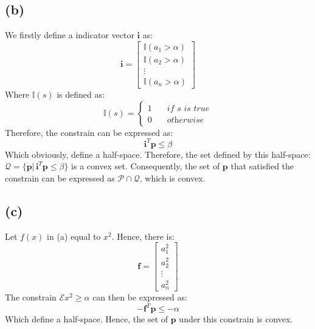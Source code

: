 \documentclass[10pt,a4paper]{article}
\begin{document}
\subsection*{(b)}
We firstly define a indicator vector $\mathbf{i}$ as:
\begin{equation*}
	\mathbf{i} = \begin{bmatrix}
	\mathbb{I}(a_{1} > \alpha) \\
	\mathbb{I}(a_{2} > \alpha) \\
	\vdots \\
	\mathbb{I}(a_{n} > \alpha)
	\end{bmatrix}
\end{equation*}
Where $\mathbb{I}(s)$ is defined as:
\begin{equation*}
	\mathbb{I}(s) = 
	\begin{cases}
		1 & \quad \textit{if } s \textit{ is true} \\
		0 & \quad \textit{otherwise}
	\end{cases}
\end{equation*} 
Therefore, the constrain can be expressed as:
\begin{equation*}
	\mathbf{i}^{T} \mathbf{p} \leq \beta
\end{equation*}
Which obviously, define a half-space. Therefore, the set defined by this half-space: $\mathcal{Q} = \{ \mathbf{p} |\,  \mathbf{i}^{T} \mathbf{p} \leq \beta \}$ is a convex set. Consequently, the set of $\mathbf{p}$ that satisfied the constrain can be expressed as $\mathcal{P} \cap \mathcal{Q}$, which is convex.

\subsection*{(c)}
Let $f(x)$ in (a) equal to $x^{2}$. Hence, there is:
\begin{equation*}
	\mathbf{f} = \begin{bmatrix}
	a_{1}^{2} \\
	a_{2}^{2} \\
	\vdots \\
	a_{n}^{2}
	\end{bmatrix}
\end{equation*}
The constrain $\mathcal{E}x^{2} \geq \alpha$ can then be expressed as:
\begin{equation*}
	-\mathbf{f}^{T} \mathbf{p} \leq -\alpha
\end{equation*}
Which define a half-space. Hence, the set of $\mathbf{p}$ under this constrain is convex.
\end{document}
